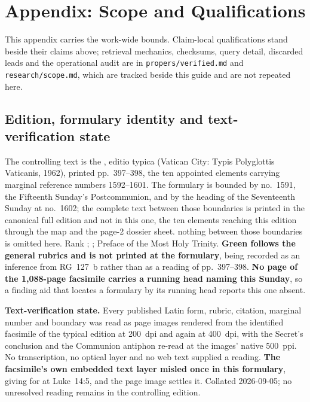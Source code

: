 \sectionguard
\section*{Appendix: Scope and Qualifications}

This appendix carries the work-wide bounds. Claim-local qualifications stand
beside their claims above; retrieval mechanics, checksums, query detail,
discarded leads and the operational audit are in \texttt{propers/verified.md}
and \texttt{research/scope.md}, which are tracked beside this guide and are not
repeated here.

\editionnote

\subsection*{Edition, formulary identity and text-verification state}

The controlling text is the , editio typica (Vatican City:
Typis Polyglottis Vaticanis, 1962), printed pp.~397--398, the ten appointed
elements carrying marginal reference numbers 1592--1601. The formulary is
bounded by no.~1591, the Fifteenth Sunday's Postcommunion, and by the heading of
the Seventeenth Sunday at no.~1602;%
\ifdefined\TriptychSynthesisEdition{} the complete text between those boundaries
is printed in the canonical full edition and not in this one, the ten elements
reaching this edition through the map and the page-2 dossier sheet.%
\else{} nothing between those boundaries is omitted
here.%
\fi{} Rank ; ; Preface of the Most Holy Trinity.
\textbf{Green follows the general rubrics and is not printed at the formulary},
being recorded as an inference from RG~127~b rather than as a reading of
pp.~397--398. \textbf{No page of the 1,088-page facsimile carries a running head
naming this Sunday}, so a finding aid that locates a formulary by its running
head reports this one absent.

\textbf{Text-verification state.} Every published Latin form, rubric, citation,
marginal number and boundary was read as page images rendered from the
identified facsimile of the typical edition at 200~dpi and again at 400~dpi,
with the Secret's conclusion and the Communion antiphon re-read at the images'
native 500~ppi. No transcription, no optical layer and no web text supplied a
reading. \textbf{The facsimile's own embedded text layer misled once in this
formulary}, giving  for  at Luke~14:5, and the
page image settles it. Collated 2026-09-05; no unresolved reading remains in the
controlling edition.

